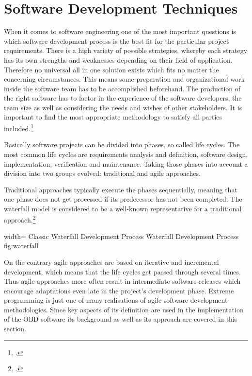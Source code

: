 
\chapter{Software Development Techniques}
\label{sec:SDT}

When it comes to software engineering one of the most important questions is which software development process 
is the best fit for the particular project requirements. There is a high variety of possible strategies, whereby 
each strategy has its own strengths and weaknesses depending on their field of application. Therefore no universal 
all in one solution exists which fits no matter the concerning circumstances. This means some preparation and 
organizational work inside the software team has to be accomplished beforehand. The production of the right software 
has to factor in the experience of the software developers, the team size as well as considering the needs and wishes 
of other stakeholders. It is important to find the most appropriate methodology to satisfy all parties included.\footcite{???}

Basically software projects can be divided into phases, so called life cycles. The most common life cycles are 
requirements analysis and definition, software design, implementation, verification and maintenance. Taking those 
phases into account a division into two groups evolved: traditional and agile approaches.

Traditional approaches typically execute the phases sequentially, meaning that one phase does not get processed if 
its predecessor has not been completed. The waterfall model is considered to be a well-known representative for a traditional approach.\footcite{WATERFALL}

 {width=\textwidth}%
 {Classic Waterfall Development Process }%
 {Waterfall Development Process}%
 {fig:waterfall}%

On the contrary agile approaches are based on iterative and incremental development, which means that the life cycles 
get passed through several times. Thus agile approaches more often result in intermediate software releases which 
encourage adaptations even late in the project’s development phase. Extreme programming is just one of many realisations 
of agile software development methodologies. Since key aspects of its definition are used in the implementation of the OBD 
software its background as well as its approach are covered in this section. 

